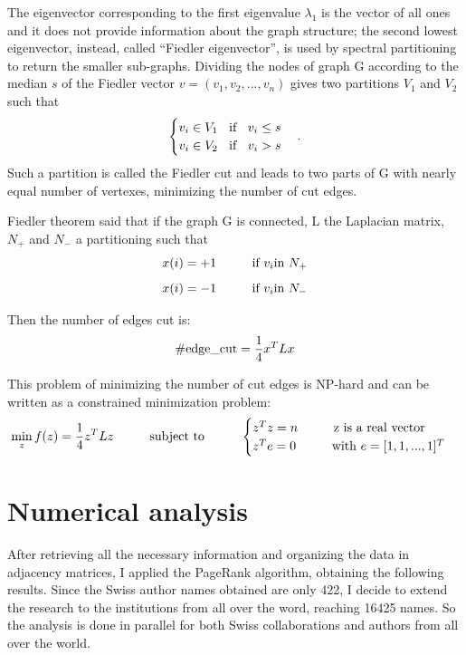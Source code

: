 \documentclass[]{usiinfbachelorproject}
\newcommand\tab[1][1cm]{\hspace*{#1}}
\begin{document}
The eigenvector corresponding to the first eigenvalue $\lambda_1$ is the vector of all ones and it does not provide information about the graph structure; the second lowest eigenvector, instead, called ``Fiedler eigenvector'', is used by spectral partitioning to return the smaller sub-graphs. Dividing the nodes of graph G according to the median $s$ of the Fiedler vector $v = (v_1,v_2,...,v_n)$ gives two partitions $V_1$ and $V_2$ such that
\begin{equation}\notag
\begin{cases}
v_i \in V_1 \text{\;\; if \;\;} v_i \leq s \\
v_i \in V_2 \text{\;\; if \;\;} v_i > s
\end{cases} .
\end{equation}
Such a partition is called the Fiedler cut and leads to two parts of G with nearly equal number of vertexes, minimizing the number of cut edges. 

Fiedler theorem said that if the graph G is connected, L the Laplacian matrix, $N_+$ and $N_-$ a partitioning such that
\begin{equation}\notag
x(i) = +1 \tab \text{if } v_i \text{in } N_+ 
\end{equation}
\begin{equation}\notag
x(i) = -1 \tab \text{if } v_i \text{in } N_-
\end{equation}

Then the number of edges cut is:
\begin{equation}\notag
\#\text{edge\_cut} = \frac{1}{4}x^T L x
\end{equation}

This problem of minimizing the number of cut edges is NP-hard and can be written as a constrained minimization problem:
\begin{equation}\notag
\min\limits_z f(z)=\frac{1}{4} z^T L z \tab \text{subject to} \tab 
\begin{cases}
z^T z = n \tab \text{z is a real vector}\\
z^T e = 0 \tab \text{with } e=[1,1,...,1]^T
\end{cases}
\end{equation}








\section{Numerical analysis}
After retrieving all the necessary information and organizing the data in adjacency matrices, I applied the PageRank algorithm, obtaining the following results.
Since the Swiss author names obtained are only 422, I decide to extend the research to the institutions from all over the word, reaching 16425 names. So the analysis is done in parallel for both Swiss collaborations and authors from all over the world.
\end{document}
